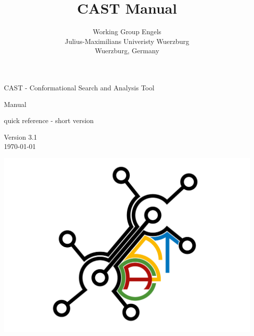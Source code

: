 \documentclass[10pt,a4paper]{article} %
\title{CAST Manual}
\author{Working Group Engels \\
	Julius-Maximilians Univeristy Wuerzburg \\
	Wuerzburg, Germany}
\newif\ifverbose %
\newif\ifdevelopment %
\newif\ifdevmode %
\begin{document}

\begin{center} 
	CAST - Conformational Search and Analysis Tool

	\ifdevelopment
		Manual for developers and programmers
	\else
		Manual
	\fi

	\ifverbose\else
		quick reference - short version
	\fi

	\ifdevmode
		\colorbox{green}{DEV MODE! THIS MANUAL IS NOT DESTINED TO BE RELEASED!}
	\fi

	Version 3.1 \\
	\today

	\includegraphics[width=\textwidth]{img/CAST_CMYK_small.png}
	\end{center}

	\newpage
	\tableofcontents


	\newpage
	\listoffigures

	\newpage
	
\end{document}
